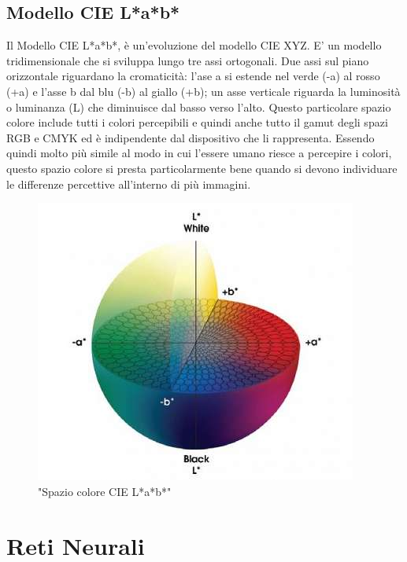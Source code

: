 \documentclass[a4paper,11pt]{article}
\begin{document}
    
        \newpage

        \subsection{Modello CIE L*a*b*}
        Il Modello CIE L*a*b*, è un'evoluzione del modello CIE XYZ. E' un modello tridimensionale che si sviluppa lungo tre assi ortogonali. Due assi sul piano orizzontale riguardano la cromaticità: l'ase a si estende nel verde (-a) al rosso (+a)
        e l'asse b dal blu (-b) al giallo (+b); un asse verticale riguarda la luminosità o luminanza (L) che diminuisce dal basso verso l'alto.
        Questo particolare spazio colore include tutti i colori percepibili e quindi anche tutto il gamut degli spazi RGB e CMYK ed è indipendente dal dispositivo che li rappresenta.
        Essendo quindi molto più simile al modo in cui l'essere umano riesce a percepire i colori, questo spazio colore si presta particolarmente bene quando si devono individuare le differenze percettive all'interno di più immagini.

    
        \begin{figure}[h]
            \centering
            \includegraphics[scale=0.8]{CIELAB.jpg}
            \caption{"Spazio colore CIE L*a*b*"}
        \end{figure}

    \newpage

    \section {Reti Neurali}
\end{document}
